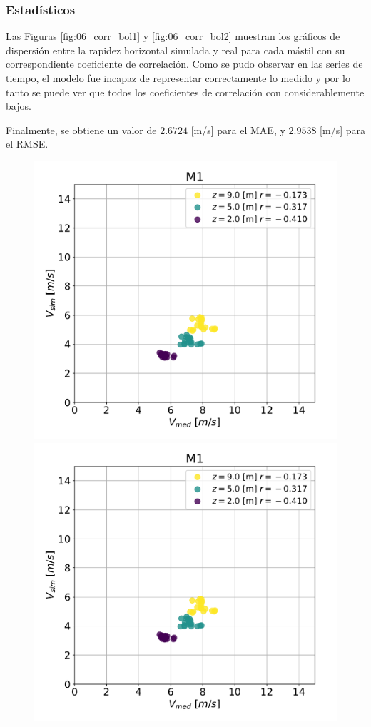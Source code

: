 \subsubsection{Estadísticos}
Las Figuras \ref{fig:06_corr_bol1} y \ref{fig:06_corr_bol2} muestran los gráficos de dispersión entre la rapidez horizontal simulada y real para cada mástil con su correspondiente coeficiente de correlación. Como se pudo observar en las series de tiempo, el modelo fue incapaz de representar correctamente lo medido y por lo tanto se puede ver que todos los coeficientes de correlación con considerablemente bajos.

Finalmente, se obtiene un valor de $2.6724$ [m/s] para el MAE, y $2.9538$ [m/s] para el RMSE.
\newpage
\vspace*{\fill}
\begin{figure}[H]
	\centering
	\includegraphics[width=0.5\linewidth,page=1,trim={0cm 0cm 0cm 0cm},clip]{Imagenes/06/bol/corr}%
	\includegraphics[width=0.5\linewidth,page=2,trim={0cm 0cm 0cm 0cm},clip]{Imagenes/06/bol/corr}%
	

\end{figure}
